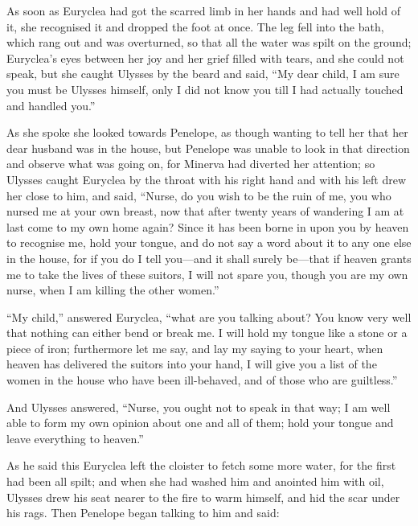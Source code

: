 As soon as Euryclea had got the scarred limb in her hands and had well hold of
it, she recognised it and dropped the foot at once. The leg fell into the bath,
which rang out and was overturned, so that all the water was spilt on the
ground; Euryclea’s eyes between her joy and her grief filled with tears, and
she could not speak, but she caught Ulysses by the beard and said, “My dear
child, I am sure you must be Ulysses himself, only I did not know you till I
had actually touched and handled you.”

As she spoke she looked towards Penelope, as though wanting to tell her that
her dear husband was in the house, but Penelope was unable to look in that
direction and observe what was going on, for Minerva had diverted her
attention; so Ulysses caught Euryclea by the throat with his right hand and
with his left drew her close to him, and said, “Nurse, do you wish to be the
ruin of me, you who nursed me at your own breast, now that after twenty years
of wandering I am at last come to my own home again? Since it has been borne in
upon you by heaven to recognise me, hold your tongue, and do not say a word
about it to any one else in the house, for if you do I tell you—and it shall
surely be—that if heaven grants me to take the lives of these suitors, I will
not spare you, though you are my own nurse, when I am killing the other women.”

“My child,” answered Euryclea, “what are you talking about? You know very well
that nothing can either bend or break me. I will hold my tongue like a stone or
a piece of iron; furthermore let me say, and lay my saying to your heart, when
heaven has delivered the suitors into your hand, I will give you a list of the
women in the house who have been ill-behaved, and of those who are guiltless.”

And Ulysses answered, “Nurse, you ought not to speak in that way; I am well
able to form my own opinion about one and all of them; hold your tongue and
leave everything to heaven.”

As he said this Euryclea left the cloister to fetch some more water, for the
first had been all spilt; and when she had washed him and anointed him with
oil, Ulysses drew his seat nearer to the fire to warm himself, and hid the scar
under his rags. Then Penelope began talking to him and said:

